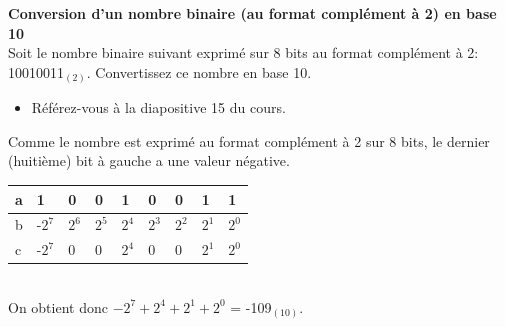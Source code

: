 \begin{Exercice}[5 minutes] \textbf{Conversion d'un nombre binaire (au format complément à 2) en base 10}\\
    
    Soit le nombre binaire suivant exprimé sur 8 bits au format complément à 2: 10010011$_{(2)}$. Convertissez ce nombre en base 10. \\
	
    \begin{conseil}
    
    \begin{itemize}
    	\item Référez-vous à la diapositive 15 du cours. 
    \end{itemize}
    
    \end{conseil}
    
    \begin{solution}

       Comme le nombre est exprimé au format complément à 2 sur 8 bits, le dernier (huitième) bit à gauche a une valeur négative.  
       \\
       
       \begin{tabular}{| p{1cm} | p{1cm} | p{1cm} | p{1cm} | p{1cm} | p{1cm} | p{1cm} | p{1cm} | p{1cm} |} 
            \hline
            a & 1 & 0 & 0 & 1 & 0 & 0 & 1 & 1 \\  
            \hline
            b & -$2^7$ & $2^6$ & $2^5$ & $2^4$ & $2^3$ & $2^2$ & $2^1$ & $2^0$ \\ 
            \hline
            c & -$2^7$ & 0 & 0 & $2^4$ & 0 & 0 & $2^1$ & $2^0$ \\ 
            \hline
        \end{tabular} \\
        
        On obtient donc $-2^7 + 2^4 + 2^1 + 2^0$ = -109$_{(10)}$.
       
    \end{solution}
\end{Exercice}




   

